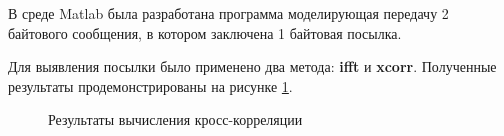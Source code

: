 \documentclass[a4paper,14pt]{extarticle}
\begin{document}
В среде Matlab была разработана программа моделирующая передачу 2 байтового сообщения, в котором заключена 1 байтовая посылка.

Для выявления посылки было применено два метода: \textbf{ifft} и \textbf{xcorr}. Полученные результаты продемонстрированы на рисунке \ref{014}.


\begin{figure}[h]
\begin{minipage}[h]{0.49\linewidth}
\end{minipage}
\hfill
\begin{minipage}[h]{0.49\linewidth}
\end{minipage}
\caption{Результаты вычисления кросс-корреляции}
\label{014}
\end{figure}
\end{document}
